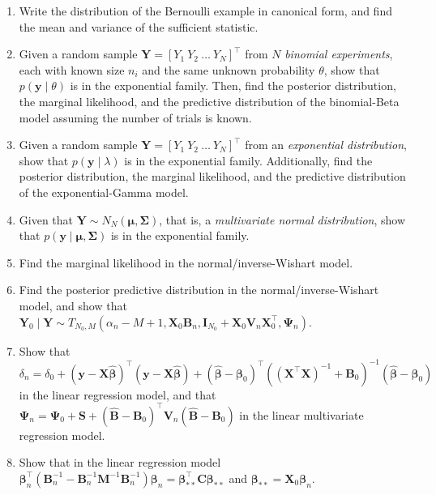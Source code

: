 \begin{enumerate}
	\item Write the distribution of the Bernoulli example in canonical form, and find the mean and variance of the sufficient statistic.
	
	\item Given a random sample \(\bm{Y} = [Y_1 \ Y_2 \ \dots \ Y_N]^{\top}\) from \(N\) \textit{binomial experiments}, each with known size \(n_i\) and the same unknown probability \(\theta\), show that \(p(\bm{y} \mid \theta)\) is in the exponential family. Then, find the posterior distribution, the marginal likelihood, and the predictive distribution of the binomial-Beta model assuming the number of trials is known.
	
	\item Given a random sample \(\bm{Y} = [Y_1 \ Y_2 \ \dots \ Y_N]^{\top}\) from an \textit{exponential distribution}, show that \(p(\bm{y} \mid \lambda)\) is in the exponential family. Additionally, find the posterior distribution, the marginal likelihood, and the predictive distribution of the exponential-Gamma model.
	
	\item Given that \(\bm{Y} \sim N_N(\bm{\mu}, \bm{\Sigma})\), that is, a \textit{multivariate normal distribution}, show that \(p(\bm{y} \mid \bm{\mu}, \bm{\Sigma})\) is in the exponential family.
	
	\item Find the marginal likelihood in the normal/inverse-Wishart model.
		
	\item Find the posterior predictive distribution in the normal/inverse-Wishart model, and show that ${\bm{Y}}_0\mid {\bm{Y}}\sim T_{N_0,M}(\alpha_n-M+1,{\bm{X}}_0{\bm{B}}_n,{\bm{I}}_{N_0}+{\bm{X}}_0{\bm{V}}_n{\bm{X}}_0^{\top},{\bm{\Psi}}_n)$.
	
	\item Show that $\delta_n=\delta_0+({\bm{y}}-{\bm{X}}\hat{\bm{\beta}})^{\top}({\bm{y}}-{\bm{X}}\hat{\bm{\beta}})+(\hat{\bm{\beta}}-\bm{\beta}_0)^{\top}(({\bm{X}}^{\top}{\bm{X}})^{-1}+{\bm{B}}_0)^{-1}(\hat{\bm{\beta}}-\bm{\beta}_0)$ in the linear regression model, and that ${\bm{\Psi}}_{n}={\bm{\Psi}}_{0}+{\bm{S}}+(\hat{\bm{B}}-{\bm{B}}_{0})^{\top}{\bm{V}}_{n}(\hat{\bm{B}}-{\bm{B}}_{0})$ in the linear multivariate regression model. 
			
	\item Show that in the linear regression model $\bm{\beta}_n^{\top}({\bm{B}}_n^{-1}-{\bm{B}}_n^{-1}{\bm{M}}^{-1}{\bm{B}}_n^{-1})\bm{\beta}_n={\bm{\bm{\beta}}}_{**}^{\top}{\bm{C}}{\bm{\bm{\beta}}}_{**}$ and $\bm{\beta}_{**}={\bm{X}}_0\bm{\beta}_n$.
	

\end{enumerate}
